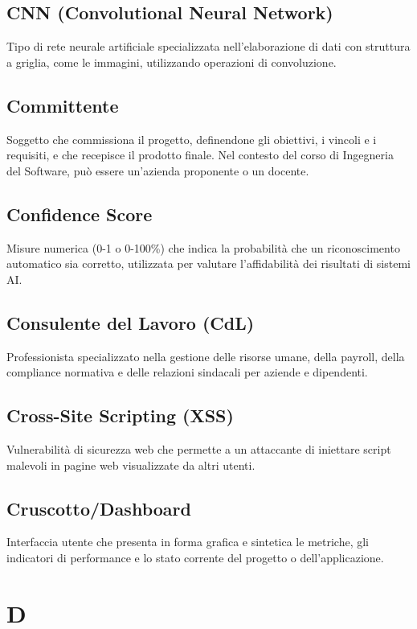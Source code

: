 \documentclass[a4paper,11pt]{article}
\begin{document}
\subsection{CNN (Convolutional Neural Network)}
Tipo di rete neurale artificiale specializzata nell'elaborazione di dati con struttura a griglia, come le immagini, utilizzando operazioni di convoluzione.

\subsection{Committente}
Soggetto che commissiona il progetto, definendone gli obiettivi, i vincoli e i requisiti, e che recepisce il prodotto finale. Nel contesto del corso di Ingegneria del Software, può essere un'azienda proponente o un docente.

\subsection{Confidence Score}
Misure numerica (0-1 o 0-100\%) che indica la probabilità che un riconoscimento automatico sia corretto, utilizzata per valutare l'affidabilità dei risultati di sistemi AI.

\subsection{Consulente del Lavoro (CdL)}
Professionista specializzato nella gestione delle risorse umane, della payroll, della compliance normativa e delle relazioni sindacali per aziende e dipendenti.

\subsection{Cross-Site Scripting (XSS)}
Vulnerabilità di sicurezza web che permette a un attaccante di iniettare script malevoli in pagine web visualizzate da altri utenti.

\subsection{Cruscotto/Dashboard}
Interfaccia utente che presenta in forma grafica e sintetica le metriche, gli indicatori di performance e lo stato corrente del progetto o dell'applicazione.

\newpage
\section{D}
\end{document}
